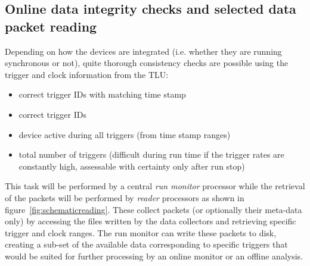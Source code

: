 \documentclass[paper=a4, fontsize=11pt]{scrartcl}	%
\numberwithin{equation}{section}		%
\numberwithin{figure}{section}			%
\numberwithin{table}{section}           	%
\begin{document}
\subsection{Online data integrity checks and selected data packet reading}
\label{sec:integrity}
Depending on how the devices are integrated (i.e. whether they are running
synchronous or not), quite thorough consistency checks are
possible using the trigger and clock information from the TLU:

\begin{itemize}
\item correct trigger IDs with matching time stamp
\item correct trigger IDs
\item device active during all triggers (from time stamp ranges)
\item total number of triggers (difficult during run time if the trigger
  rates are constantly high, assessable with certainty only after run stop)
\end{itemize}

This task will be performed by a central \emph{run monitor} processor
while the retrieval of the packets will be performed by \emph{reader}
processors as shown in figure~\ref{fig:schematicreading}. These
collect packets (or optionally their meta-data only) by accessing the
files written by the data collectors and retrieving specific trigger
and clock ranges. The run monitor can write these packets to disk,
creating a sub-set of the available data corresponding to specific
triggers that would be suited for further processing by an online
monitor or an offline analysis. 
\end{document}

